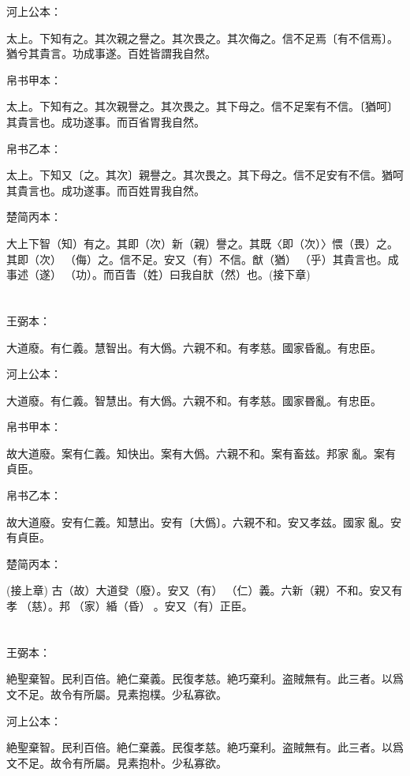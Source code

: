 \documentclass[a5paper]{ctexbook}
\begin{document}
    河上公本：

    太上。下知有之。其次親之譽之。其次畏之。其次侮之。信不足焉〔有不信焉〕。猶兮其貴言。功成事遂。百姓皆謂我自然。

    帛书甲本：

    太上。下知有之。其次親譽之。其次畏之。其下母之。信不足案有不信。〔猶呵〕其貴言也。成功遂事。而百省胃我自然。

    帛书乙本：

    太上。下知又〔之。其次〕親譽之。其次畏之。其下母之。信不足安有不信。猶呵其貴言也。成功遂事。而百姓胃我自然。

    楚简丙本：

    大上下智（知）有之。其即（次）新（親）譽之。其既〈即（次）〉愄（畏）之。其即（次）󶵡（侮）之。信不足。安又（有）不信。猷（猶）󶴋（乎）其貴言也。成事述（遂）𬒬（功）。而百眚（姓）曰我自肰（然）也。(接下章)

    \chapter{}
    王弼本：

    大道廢。有仁義。慧智出。有大僞。六親不和。有孝慈。國家昏亂。有忠臣。

    河上公本：

    大道廢。有仁義。智慧出。有大僞。六親不和。有孝慈。國家昬亂。有忠臣。

    帛书甲本：

    故大道廢。案有仁義。知快出。案有大僞。六親不和。案有畜兹。邦家𨴽亂。案有貞臣。

    帛书乙本：

    故大道廢。安有仁義。知慧出。安有〔大僞〕。六親不和。安又孝兹。國家𨴽亂。安有貞臣。

    楚简丙本：

    (接上章) 古（故）大道癹（廢）。安又（有）󶴑（仁）義。六新（親）不和。安又有孝𡥝（慈）。邦𧱌（家）緍（昏）☐。安又（有）正臣。

    \chapter{}
    王弼本：

    絶聖棄智。民利百倍。絶仁棄義。民復孝慈。絶巧棄利。盗賊無有。此三者。以爲文不足。故令有所屬。見素抱樸。少私寡欲。

    河上公本：

    絶聖棄智。民利百倍。絶仁棄義。民復孝慈。絶巧棄利。盗賊無有。此三者。以爲文不足。故令有所屬。見素抱朴。少私寡欲。
\end{document}
